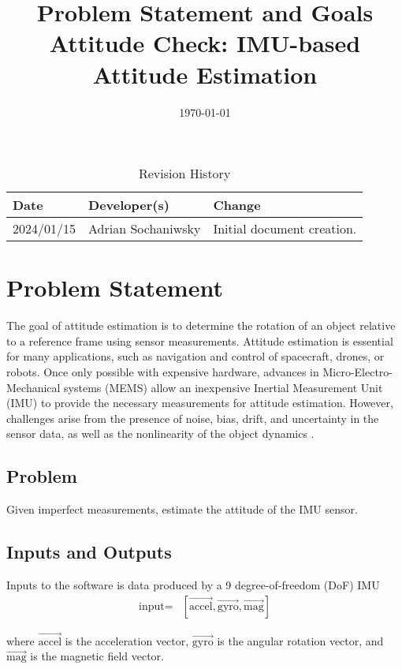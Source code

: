 \documentclass{article}
\title{Problem Statement and Goals \\ Attitude Check: IMU-based Attitude Estimation}
\author{\authname}
\date{\today}
\begin{document}
\maketitle

\begin{table}[hp]
\caption{Revision History} \label{TblRevisionHistory}
\begin{tabularx}{\textwidth}{llX}
\toprule
\textbf{Date} & \textbf{Developer(s)} & \textbf{Change}\\
\midrule
2024/01/15 & Adrian Sochaniwsky & Initial document creation.\\
\bottomrule
\end{tabularx}
\end{table}

\section{Problem Statement}

The goal of attitude estimation is to determine the rotation of an object relative to a reference frame using sensor measurements. Attitude estimation is essential for many applications, such as navigation and control of spacecraft, drones, or robots. Once only possible with expensive hardware, advances in Micro-Electro-Mechanical systems (MEMS) allow an inexpensive Inertial Measurement Unit (IMU) to provide the necessary measurements for attitude estimation. However, challenges arise from the presence of noise, bias, drift, and uncertainty in the sensor data, as well as the nonlinearity of the object dynamics \cite{statement}.

\subsection{Problem}

Given imperfect measurements, estimate the attitude of the IMU sensor.

\subsection{Inputs and Outputs}

Inputs to the software is data produced by a 9 degree-of-freedom (DoF) IMU
\begin{align*}
    \text{input} =& [\vec{\text{accel}}, \vec{\text{gyro}}, \vec{\text{mag}}]
\end{align*}

where $\vec{\text{accel}}$ is the acceleration vector, $\vec{\text{gyro}}$ is the angular rotation vector, and $\vec{\text{mag}}$ is the magnetic field vector.
\end{document}
